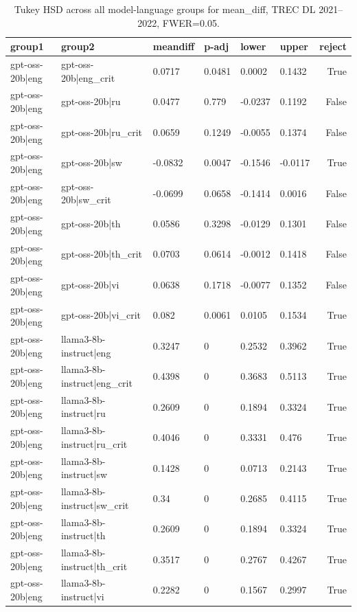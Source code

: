\begin{table}
\caption{Tukey HSD across all model-language groups for mean_diff, TREC DL 2021--2022, FWER=0.05.}
\label{tab:tukey_all_models_all_langs_2021_2022_mean_diff}
\begin{tabular}{llllllr}
\toprule
group1 & group2 & meandiff & p-adj & lower & upper & reject \\
\midrule
gpt-oss-20b|eng & gpt-oss-20b|eng_crit & 0.0717 & 0.0481 & 0.0002 & 0.1432 & True \\
gpt-oss-20b|eng & gpt-oss-20b|ru & 0.0477 & 0.779 & -0.0237 & 0.1192 & False \\
gpt-oss-20b|eng & gpt-oss-20b|ru_crit & 0.0659 & 0.1249 & -0.0055 & 0.1374 & False \\
gpt-oss-20b|eng & gpt-oss-20b|sw & -0.0832 & 0.0047 & -0.1546 & -0.0117 & True \\
gpt-oss-20b|eng & gpt-oss-20b|sw_crit & -0.0699 & 0.0658 & -0.1414 & 0.0016 & False \\
gpt-oss-20b|eng & gpt-oss-20b|th & 0.0586 & 0.3298 & -0.0129 & 0.1301 & False \\
gpt-oss-20b|eng & gpt-oss-20b|th_crit & 0.0703 & 0.0614 & -0.0012 & 0.1418 & False \\
gpt-oss-20b|eng & gpt-oss-20b|vi & 0.0638 & 0.1718 & -0.0077 & 0.1352 & False \\
gpt-oss-20b|eng & gpt-oss-20b|vi_crit & 0.082 & 0.0061 & 0.0105 & 0.1534 & True \\
gpt-oss-20b|eng & llama3-8b-instruct|eng & 0.3247 & 0 & 0.2532 & 0.3962 & True \\
gpt-oss-20b|eng & llama3-8b-instruct|eng_crit & 0.4398 & 0 & 0.3683 & 0.5113 & True \\
gpt-oss-20b|eng & llama3-8b-instruct|ru & 0.2609 & 0 & 0.1894 & 0.3324 & True \\
gpt-oss-20b|eng & llama3-8b-instruct|ru_crit & 0.4046 & 0 & 0.3331 & 0.476 & True \\
gpt-oss-20b|eng & llama3-8b-instruct|sw & 0.1428 & 0 & 0.0713 & 0.2143 & True \\
gpt-oss-20b|eng & llama3-8b-instruct|sw_crit & 0.34 & 0 & 0.2685 & 0.4115 & True \\
gpt-oss-20b|eng & llama3-8b-instruct|th & 0.2609 & 0 & 0.1894 & 0.3324 & True \\
gpt-oss-20b|eng & llama3-8b-instruct|th_crit & 0.3517 & 0 & 0.2767 & 0.4267 & True \\
gpt-oss-20b|eng & llama3-8b-instruct|vi & 0.2282 & 0 & 0.1567 & 0.2997 & True \\

\end{tabular}
\end{table}
